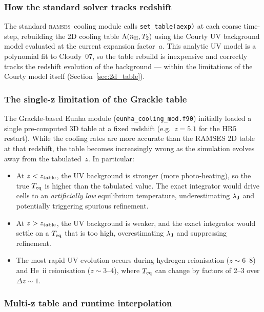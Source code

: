 \documentclass[fleqn,usenatbib]{mnras}
\newcommand{\lJ}{\lambda_{\rm J}}
\newcommand{\ramses}{\textsc{ramses}}
\newcommand{\code}[1]{\texttt{#1}}
\begin{document}
\subsubsection{How the standard solver tracks redshift}

The standard \ramses\ cooling module calls \code{set\_table(aexp)} at
each coarse time-step, rebuilding the 2D cooling table
$\Lambda(n_{\rm H}, T_2)$ using the Courty UV background model
evaluated at the current expansion factor~$a$.  This analytic UV model
is a polynomial fit to Cloudy~07, so the table rebuild is
inexpensive and correctly tracks the redshift evolution of the
background --- within the limitations of the Courty model itself
(Section~\ref{sec:2d_table}).

\subsubsection{The single-z limitation of the Grackle table}

The Grackle-based Eunha module (\code{eunha\_cooling\_mod.f90})
initially loaded a single pre-computed 3D table at a fixed redshift
(e.g.\ $z = 5.1$ for the HR5 restart).  While the cooling rates are
more accurate than the RAMSES 2D table at that redshift, the table
becomes increasingly wrong as the simulation evolves away from the
tabulated~$z$.  In particular:

\begin{itemize}
  \item At $z < z_{\rm table}$, the UV background is stronger (more
    photo-heating), so the true $T_{\rm eq}$ is higher than the
    tabulated value.  The exact integrator would drive cells to an
    \emph{artificially low} equilibrium temperature, underestimating
    $\lJ$ and potentially triggering spurious refinement.
  \item At $z > z_{\rm table}$, the UV background is weaker, and the
    exact integrator would settle on a $T_{\rm eq}$ that is too high,
    overestimating $\lJ$ and suppressing refinement.
  \item The most rapid UV evolution occurs during hydrogen reionisation
    ($z \sim 6$--$8$) and He~{\sc ii} reionisation ($z \sim 3$--$4$),
    where $T_{\rm eq}$ can change by factors of 2--3 over $\Delta z
    \sim 1$.
\end{itemize}

\subsubsection{Multi-z table and runtime interpolation}
\end{document}
